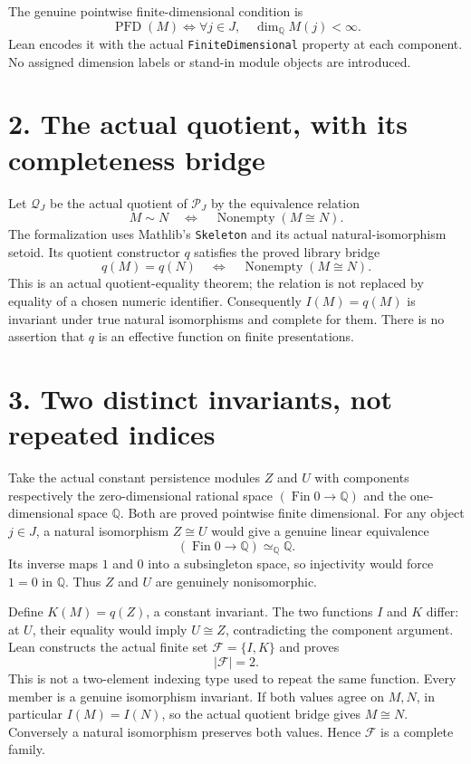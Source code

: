 \documentclass[10pt]{article}
\begin{document}
The genuine pointwise finite-dimensional condition is
\[
 \operatorname{PFD}(M)\iff
 \forall j\in J,\quad \dim_{\mathbb Q}M(j)<\infty.
\]
Lean encodes it with the actual \texttt{FiniteDimensional} property at each component. No assigned dimension labels or stand-in module objects are introduced.

\section*{2. The actual quotient, with its completeness bridge}
Let $\mathcal Q_J$ be the actual quotient of $\mathcal P_J$ by the equivalence relation
\[
 M\sim N\quad\Longleftrightarrow\quad
 \operatorname{Nonempty}(M\cong N).
\]
The formalization uses Mathlib's \texttt{Skeleton} and its actual natural-isomorphism setoid. Its quotient constructor $q$ satisfies the proved library bridge
\[
 q(M)=q(N)\quad\Longleftrightarrow\quad
 \operatorname{Nonempty}(M\cong N).
\]
This is an actual quotient-equality theorem; the relation is not replaced by equality of a chosen numeric identifier. Consequently $I(M)=q(M)$ is invariant under true natural isomorphisms and complete for them. There is no assertion that $q$ is an effective function on finite presentations.

\section*{3. Two distinct invariants, not repeated indices}
Take the actual constant persistence modules $Z$ and $U$ with components respectively the zero-dimensional rational space $(\operatorname{Fin}0\to\mathbb Q)$ and the one-dimensional space $\mathbb Q$. Both are proved pointwise finite dimensional. For any object $j\in J$, a natural isomorphism $Z\cong U$ would give a genuine linear equivalence
\[
 (\operatorname{Fin}0\to\mathbb Q)\simeq_{\mathbb Q}\mathbb Q.
\]
Its inverse maps $1$ and $0$ into a subsingleton space, so injectivity would force $1=0$ in $\mathbb Q$. Thus $Z$ and $U$ are genuinely nonisomorphic.

Define $K(M)=q(Z)$, a constant invariant. The two functions $I$ and $K$ differ: at $U$, their equality would imply $U\cong Z$, contradicting the component argument. Lean constructs the actual finite set $\mathcal F=\{I,K\}$ and proves
\[
 |\mathcal F|=2.
\]
This is not a two-element indexing type used to repeat the same function. Every member is a genuine isomorphism invariant. If both values agree on $M,N$, in particular $I(M)=I(N)$, so the actual quotient bridge gives $M\cong N$. Conversely a natural isomorphism preserves both values. Hence $\mathcal F$ is a complete family.
\end{document}
